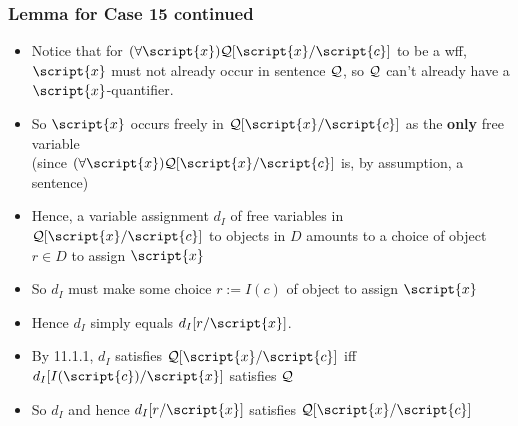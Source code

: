 \begin{frame}
\frametitle{Lemma for Case 15 continued}

\begin{itemize}[<+->]

\item Notice that for $\qt{\forall}{\script{x}}\metav{Q}\substitute{\script{c}}{\script{x}}$ to be a wff, $\script{x}$ must not already occur in sentence $\mathcal{Q}$, so $\mathcal{Q}$ can't already have a $\script{x}$-quantifier. 

\item So $ \script{x}$ occurs freely in $\metav{Q}\substitute{\script{c}}{\script{x}}$ as the \textbf{only} free variable \\ (since $\qt{\forall}{\script{x}}\metav{Q}\substitute{\script{c}}{\script{x}}$ is, by assumption, a sentence)

\item Hence, a variable assignment $d_I$ of free variables in $\metav{Q}\substitute{\script{c}}{\script{x}}$ to objects in $D$ amounts to a choice of object $r \in D$ to assign $\script{x}$

\item So $d_I$ must make some choice $r := I(c)$ of object to assign $\script{x}$

\item Hence $d_I$ simply equals $d_I[r/ \script{x}]$. %


\item By 11.1.1, $d_I$ satisfies $\metav{Q}\substitute{\script{c}}{\script{x}}$ iff $d_I[I(\script{c})/\script{x}]$ satisfies $\mathcal{Q}$

\item So $d_I$ and hence $d_I[r/ \script{x}]$ satisfies $\metav{Q}\substitute{\script{c}}{\script{x}}$


\end{itemize}
\end{frame}


